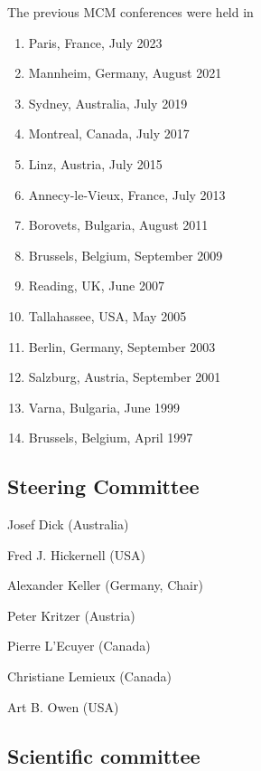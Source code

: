 The previous MCM conferences were held in
\begin{enumerate}
\item Paris, France, July 2023
\item Mannheim, Germany, August 2021
\item Sydney, Australia, July 2019
\item Montreal, Canada, July 2017
\item Linz, Austria, July 2015
\item Annecy-le-Vieux, France, July 2013
\item Borovets, Bulgaria, August 2011
\item Brussels, Belgium, September 2009
\item Reading, UK, June 2007
\item Tallahassee, USA, May 2005
\item Berlin, Germany, September 2003
\item Salzburg, Austria, September 2001
\item Varna, Bulgaria, June 1999
\item Brussels, Belgium, April 1997 
\end{enumerate}



\newpage
\subsection{Steering Committee}

\setlength{\columnsep}{1cm}
\begin{multicols}{2}
\raggedright

Josef Dick (Australia)

Fred J. Hickernell (USA)

Alexander Keller (Germany, Chair)

Peter Kritzer (Austria)

Pierre L'Ecuyer (Canada)

Christiane Lemieux (Canada)

Art B. Owen (USA)


\end{multicols}

\clearpage

\subsection{Scientific committee}



